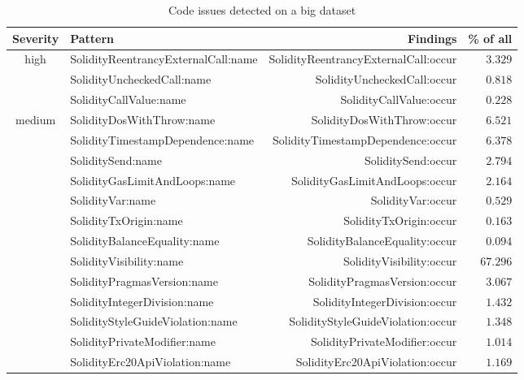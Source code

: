 \let\letcs\texapiletcs
\begin{table}[t]
	\centering
	\caption{Code issues detected on a big dataset}
	\begin{tabular}{|c|l|r|r|}
		\hline
		\textbf{Severity} & \textbf{Pattern} & \textbf{Findings} & \textbf{\% of all} \\
		\hline
		\multirow{3}{*}{high} & {\usevalue SolidityReentrancyExternalCall:name } & {\usevalue SolidityReentrancyExternalCall:occur } & $3.329$ \\
		 & {\usevalue SolidityUncheckedCall:name } & {\usevalue SolidityUncheckedCall:occur } & $0.818$ \\
		 & {\usevalue SolidityCallValue:name } & {\usevalue SolidityCallValue:occur } & $0.228$ \\
		\hline
		\multirow{8}{*}{medium} & {\usevalue SolidityDosWithThrow:name } & {\usevalue SolidityDosWithThrow:occur } & $6.521$ \\
		& {\usevalue SolidityTimestampDependence:name } & {\usevalue SolidityTimestampDependence:occur } & $6.378$ \\
		& {\usevalue SoliditySend:name } & {\usevalue SoliditySend:occur } & $2.794$ \\
		& {\usevalue SolidityGasLimitAndLoops:name } & {\usevalue SolidityGasLimitAndLoops:occur } & $2.164$ \\
		& {\usevalue SolidityVar:name } & {\usevalue SolidityVar:occur } & $0.529$ \\
		& {\usevalue SolidityTxOrigin:name } & {\usevalue SolidityTxOrigin:occur } & $0.163$ \\
		& {\usevalue SolidityBalanceEquality:name } & {\usevalue SolidityBalanceEquality:occur } & $0.094$ \\
		\hline
		\multirow{10}{*}{low} & {\usevalue SolidityVisibility:name } & {\usevalue SolidityVisibility:occur } & $67.296$ \\& {\usevalue SolidityPragmasVersion:name } & {\usevalue SolidityPragmasVersion:occur } & $3.067$ \\
		& {\usevalue SolidityIntegerDivision:name } & {\usevalue SolidityIntegerDivision:occur } & $1.432$ \\
		& {\usevalue SolidityStyleGuideViolation:name } & {\usevalue SolidityStyleGuideViolation:occur } & $1.348$ \\
		& {\usevalue SolidityPrivateModifier:name } & {\usevalue SolidityPrivateModifier:occur } & $1.014$ \\
		& {\usevalue SolidityErc20ApiViolation:name } & {\usevalue SolidityErc20ApiViolation:occur } & $1.169$ \\

\end{tabular}
\end{table}
